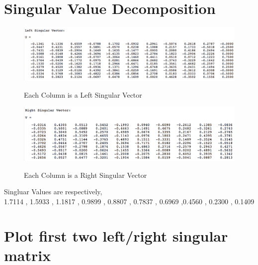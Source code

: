 \documentclass[11pt,a4paper]{article}
\begin{document}
\section{Singular Value Decomposition}
\begin{figure}[h]
    \centering
    \includegraphics[width=6.5in,height=3.in]{./lsv.png} \\
    \caption{Each Column is a Left Singular Vector}
\end{figure}

\begin{figure}[h]
    \centering
    \includegraphics[width=6.5in,height=3.in]{./rsv.png} \\
    \caption{Each Column is a Right Singular Vector}
\end{figure}
   
Singluar Values are respectively, \\ 

    1.7114 ,   1.5933  ,  1.1817 ,   0.9899 ,   0.8807  ,  0.7837  ,  0.6969
    ,0.4560  ,  0.2300 ,   0.1409

\newpage
\section{Plot first two left/right singular matrix}
\end{document}
